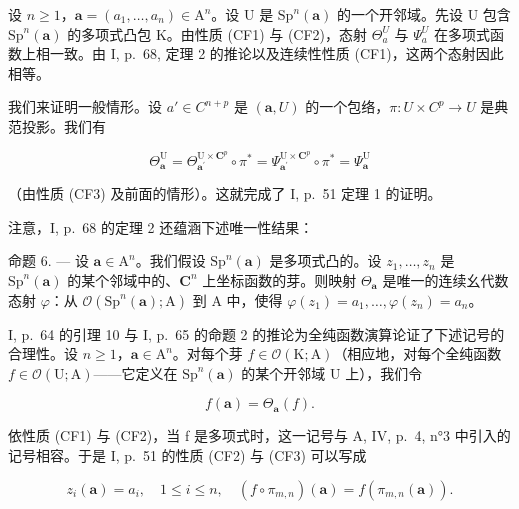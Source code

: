 设 \(n \geqslant 1\)，\(\boldsymbol{a} = (a_{1}, \ldots, a_{n}) \in \mathrm{A}^{n}\)。设 U 是 \(\mathrm{Sp}^{n}(\boldsymbol{a})\) 的一个开邻域。先设 U 包含 \(\mathrm{Sp}^{n}(\boldsymbol{a})\) 的多项式凸包 K。由性质 (CF1) 与 (CF2)，态射 \(\Theta_{a}^{U}\) 与 \(\Psi_{a}^{U}\) 在多项式函数上相一致。由 I, p.~68, 定理 2 的推论以及连续性性质 (CF1)，这两个态射因此相等。

我们来证明一般情形。设 \(a' \in C^{n+p}\) 是 \((\boldsymbol{a}, U)\) 的一个包络，\(\pi: U \times C^{p} \to U\) 是典范投影。我们有

\[
\Theta_ {\boldsymbol {a}} ^ {\mathrm{U}} = \Theta_ {\boldsymbol {a} ^ {\prime}} ^ {\mathrm{U} \times \mathbf {C} ^ {p}} \circ \pi^ {*} = \Psi_ {\boldsymbol {a} ^ {\prime}} ^ {\mathrm{U} \times \mathbf {C} ^ {p}} \circ \pi^ {*} = \Psi_ {\boldsymbol {a}} ^ {\mathrm{U}}
\]

（由性质 (CF3) 及前面的情形）。这就完成了 I, p.~51 定理 1 的证明。

注意，I, p.~68 的定理 2 还蕴涵下述唯一性结果：

命题 6. --- 设 \(\boldsymbol{a} \in \mathrm{A}^n\)。我们假设 \(\mathrm{Sp}^n(\boldsymbol{a})\) 是多项式凸的。设 \(z_1, \ldots, z_n\) 是 \(\mathrm{Sp}^n(\boldsymbol{a})\) 的某个邻域中的、\(\mathbf{C}^n\) 上坐标函数的芽。则映射 \(\Theta_{\boldsymbol{a}}\) 是唯一的连续幺代数态射 \(\varphi\)：从 \(\mathcal{O}(\mathrm{Sp}^n(\boldsymbol{a}); \mathrm{A})\) 到 A 中，使得 \(\varphi(z_1) = a_1, \ldots, \varphi(z_n) = a_n\)。

I, p.~64 的引理 10 与 I, p.~65 的命题 2 的推论为全纯函数演算论证了下述记号的合理性。设 \(n \geqslant 1\)，\(\boldsymbol{a} \in \mathrm{A}^n\)。对每个芽 \(f \in \mathcal{O}(\mathrm{K};\mathrm{A})\)（相应地，对每个全纯函数 \(f \in \mathcal{O}(\mathrm{U};\mathrm{A})\)——它定义在 \(\mathrm{Sp}^n (\boldsymbol{a})\) 的某个开邻域 U 上），我们令

\[
f (\boldsymbol {a}) = \Theta_ {\boldsymbol {a}} (f).\tag{6}
\]

依性质 (CF1) 与 (CF2)，当 f 是多项式时，这一记号与 A, IV, p.~4, n°3 中引入的记号相容。于是 I, p.~51 的性质 (CF2) 与 (CF3) 可以写成

\[
z _ {i} (\boldsymbol {a}) = a _ {i}, \quad 1 \leqslant i \leqslant n, \quad (f \circ \pi_ {m, n}) (\boldsymbol {a}) = f (\pi_ {m, n} (\boldsymbol {a})).
\]

